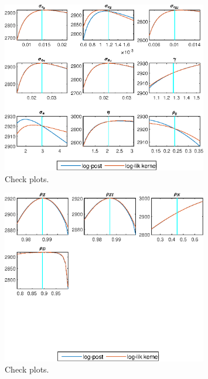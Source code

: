  
\begin{figure}[H]
\centering 
\includegraphics[width=0.80\textwidth]{BRS_growth_util/graphs/BRS_growth_util_CheckPlots1}
\caption{Check plots.}\label{Fig:CheckPlots:1}
\end{figure}
 
\begin{figure}[H]
\centering 
\includegraphics[width=0.80\textwidth]{BRS_growth_util/graphs/BRS_growth_util_CheckPlots2}
\caption{Check plots.}\label{Fig:CheckPlots:2}
\end{figure}
 
